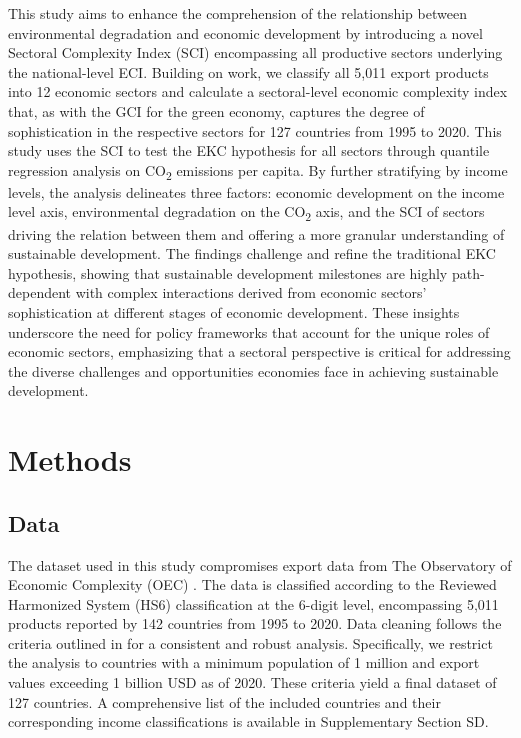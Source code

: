 \documentclass[10pt]{article}
\begin{document}
This study aims to enhance the comprehension of the relationship between environmental degradation and economic development by introducing a novel Sectoral Complexity Index (SCI) encompassing all productive sectors underlying the national-level ECI. Building on \cite{mealyEconomicComplexityGreen2022} work, we classify all 5,011 export products into 12 economic sectors and calculate a sectoral-level economic complexity index that, as with the GCI for the green economy, captures the degree of sophistication in the respective sectors for 127 countries from 1995 to 2020. This study uses the SCI to test the EKC hypothesis for all sectors through quantile regression analysis on CO\textsubscript{2} emissions per capita. By further stratifying by income levels, the analysis delineates three factors: economic development on the income level axis, environmental degradation on the CO\textsubscript{2} axis, and the SCI of sectors driving the relation between them and offering a more granular understanding of sustainable development. The findings challenge and refine the traditional EKC hypothesis, showing that sustainable development milestones are highly path-dependent with complex interactions derived from economic sectors' sophistication at different stages of economic development. These insights underscore the need for policy frameworks that account for the unique roles of economic sectors, emphasizing that a sectoral perspective is critical for addressing the diverse challenges and opportunities economies face in achieving sustainable development.

\section{Methods}
\subsection{Data}
\label{sec:data-cvars}
The dataset used in this study compromises export data from The Observatory of Economic Complexity (OEC) \citep{TheOEC}. The data is classified according to the Reviewed Harmonized System (HS6) classification at the 6-digit level, encompassing 5,011 products reported by 142 countries from 1995 to 2020. Data cleaning follows the criteria outlined in \cite{hidalgoBuildingBlocksEconomic2009} for a consistent and robust analysis. Specifically, we restrict the analysis to countries with a minimum population of 1 million and export values exceeding 1 billion USD as of 2020. These criteria yield a final dataset of 127 countries. A comprehensive list of the included countries and their corresponding income classifications is available in Supplementary Section SD.
\end{document}
